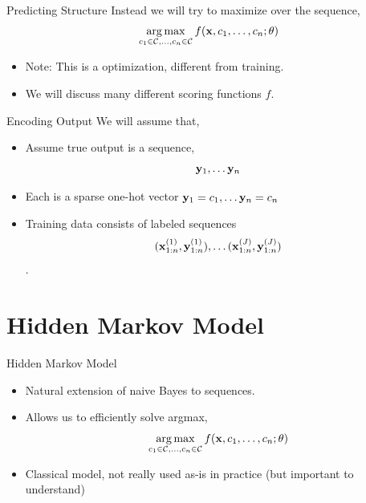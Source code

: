 \documentclass{beamer}
\begin{document}
\begin{frame}{Predicting Structure}
  Instead we will try to maximize over the sequence,
  \[ \argmax_{c_1 \in \mcC, \ldots, c_n\in \mcC} f(\boldx, c_1, \ldots, c_n; \theta)\]

  \begin{itemize}
  \item Note: This is a  optimization, different from training.
    \air

  \item We will discuss many different scoring functions $f$.
  \end{itemize}
\end{frame}


\begin{frame}{Encoding Output}
  We will assume that,
  \begin{itemize}
  \item Assume true output is a sequence,
    \[ \mathbf{y}_1, \ldots \mathbf{y}_n\] 

  \item Each is a sparse one-hot vector $\mathbf{y}_1 = c_1, \ldots \mathbf{y}_n = c_n$ 
    \air 

  \item Training data consists of labeled sequences
    \[(\mathbf{x}_{1:n}^{(1)}, \mathbf{y}_{1:n}^{(1)}), \ldots (\mathbf{x}_{1:n}^{(J)}, \mathbf{y}_{1:n}^{(J)})\].
  \end{itemize}
\end{frame}

\section{Hidden Markov Model}

\begin{frame}{Hidden Markov Model}
  \begin{itemize}
  \item Natural extension of naive Bayes to sequences.
    \air 
  \item Allows us to efficiently solve argmax,
    \[ \argmax_{c_1 \in \mcC, \ldots, c_n\in \mcC} f(\boldx, c_1, \ldots, c_n; \theta)\]
    \air 

  \item Classical model, not really used as-is in practice (but important to understand)
  \end{itemize}
\end{frame}
\end{document}
